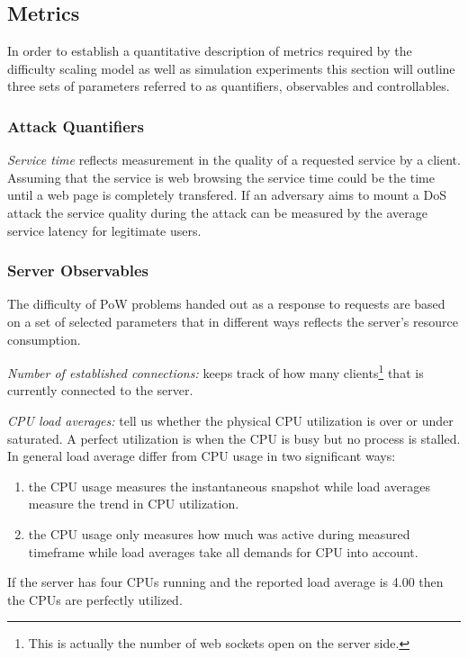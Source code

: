 \subsection{Metrics}
In order to establish a quantitative description of metrics required by the difficulty scaling model as well as simulation experiments
 this section will outline three sets of parameters referred to as quantifiers, observables and controllables. 

\subsubsection{Attack Quantifiers}

\emph{Service time} reflects measurement in the quality of a requested service by a client. Assuming that the service is web browsing the service time could be the time until a web page is completely transfered. If an adversary aims to mount a DoS attack the service quality during the attack can be measured by the average service latency for legitimate users. 

\subsubsection{Server Observables}
The difficulty of PoW problems handed out as a response to requests are based on a set of selected parameters that in different ways reflects the server's resource consumption.

\emph{Number of established connections:} keeps track of how many clients\footnote{This is actually the number of web sockets open on the server side.} that is currently connected to the server.

\emph{CPU load averages:} tell us whether the physical CPU utilization is over or under saturated. A perfect utilization is when the CPU is busy but no process is stalled. In general load average differ from CPU usage in two significant ways:
\begin{enumerate}
\item the CPU usage measures the instantaneous snapshot while load averages measure the trend in CPU utilization.
\item the CPU usage only measures how much was active during measured timeframe while load averages take all demands for CPU into account.
\end{enumerate}
If the server has four CPUs running and the reported load average is 4.00 then the CPUs are perfectly utilized\cite{cpu}.

